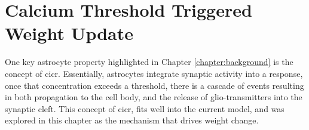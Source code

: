 

\section{Calcium Threshold Triggered Weight Update}
One key astrocyte property highlighted in Chapter \ref{chapter:background} is
the concept of \gls{cicr}. Essentially, astrocytes integrate synaptic activity into a
\ca response, once that \ca concentration exceeds a threshold, there is a
cascade of events resulting in both \ca propagation to the cell body, and the
release of glio-transmitters into the synaptic cleft. This concept of \gls{cicr}, fits
well into the current model, and was explored in this chapter as the
mechanism that drives weight change.

